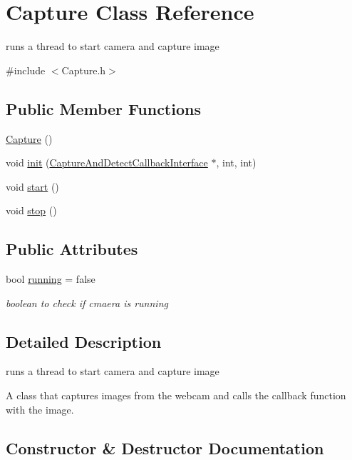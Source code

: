 \hypertarget{classCapture}{}\section{Capture Class Reference}
\label{classCapture}


runs a thread to start camera and capture image  




{\ttfamily \#include $<$Capture.\+h$>$}

\subsection*{Public Member Functions}
\begin{DoxyCompactItemize}
\item 
\hyperlink{classCapture_a97036b5d271238bd4852da79a0091b57}{Capture} ()
\item 
void \hyperlink{classCapture_a1c661ca1dca730fae534cb8f54ff6ef5}{init} (\hyperlink{classCaptureAndDetectCallbackInterface}{Capture\+And\+Detect\+Callback\+Interface} $\ast$, int, int)
\item 
void \hyperlink{classCapture_a2ffe4eeac4caa296f4fcc75cc82c1436}{start} ()
\item 
void \hyperlink{classCapture_ab632f1927461a909b18cce71ec96f76d}{stop} ()
\end{DoxyCompactItemize}
\subsection*{Public Attributes}
\begin{DoxyCompactItemize}
\item 
bool \hyperlink{classCapture_a4120483ac2f664e14a80ec5dcd9915cb}{running} = false
\begin{DoxyCompactList}\small\item\em boolean to check if cmaera is running \end{DoxyCompactList}\end{DoxyCompactItemize}


\subsection{Detailed Description}
runs a thread to start camera and capture image 

A class that captures images from the webcam and calls the callback function with the image. 

\subsection{Constructor \& Destructor Documentation}
\mbox{\label{classCapture_a97036b5d271238bd4852da79a0091b57}} 

